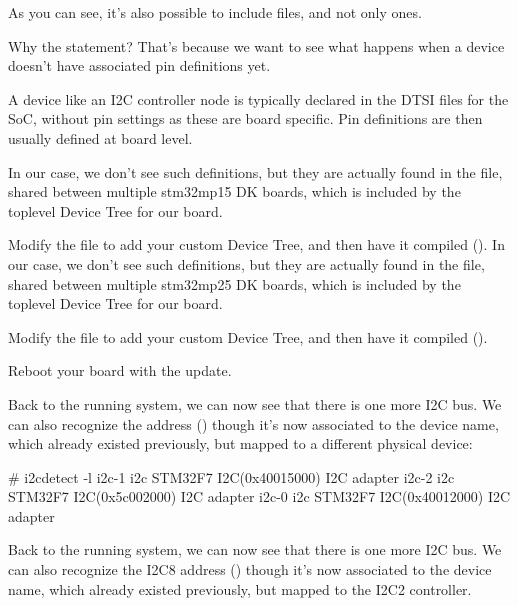 As you can see, it's also possible to include  files, and not
only  ones.

Why the  statement? That's because we want
to see what happens when a device doesn't have associated pin
definitions yet.

A device like an I2C controller node is typically declared in the DTSI
files for the SoC, without pin settings as these are board
specific. Pin definitions are then usually defined at board level.

\if{}
In our case, we don't see such definitions, but they are actually
found in the 
file, shared between multiple stm32mp15 DK boards, which is included
by the toplevel Device Tree for our board.

Modify the  file to add your custom
Device Tree, and then have it compiled ().
\fi
\if{}
In our case, we don't see such definitions, but they are actually
found in the 
file, shared between multiple stm32mp25 DK boards, which is included
by the toplevel Device Tree for our board.

Modify the  file to add your custom
Device Tree, and then have it compiled ().
\fi

Reboot your board with the update.

\if{}
Back to the running system, we can now see that there is one more
I2C bus. We can also recognize the \busname address ()
though it's now associated to the  device name, which
already existed previously, but mapped to a different physical device:

\begin{bashinput}
# i2cdetect -l
i2c-1	i2c             STM32F7 I2C(0x40015000)                 I2C adapter
i2c-2	i2c             STM32F7 I2C(0x5c002000)                 I2C adapter
i2c-0	i2c             STM32F7 I2C(0x40012000)                 I2C adapter
\end{bashinput}
\fi
\if{}
Back to the running system, we can now see that there is one more
I2C bus. We can also recognize the I2C8 address ()
though it's now associated to the  device name, which
already existed previously, but mapped to the I2C2 controller.

